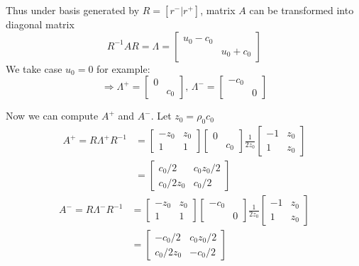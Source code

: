 \documentclass[11pt]{article}
\begin{document}
\begin{enumerate}
\begin{enumerate}
					Thus under basis generated by $R=[r^-|r^+]$, matrix $A$ can be transformed into diagonal matrix
					\[ R^{-1}AR=\Lambda=\begin{bmatrix}u_0-c_0&\\&u_0+c_0\end{bmatrix}	\]						We take case $u_0=0$ for example:					
					\[
					\Rightarrow \Lambda^+=\begin{bmatrix}0&\\&c_0\end{bmatrix}
					\text{,  }
					\Lambda^-=\begin{bmatrix}-c_0&\\&0\end{bmatrix}
					\]
					
					Now we can compute $A^+$ and $A^-$. Let $z_0=\rho_0c_0$
					\begin{align*}
					A^+=R\Lambda^+R^{-1}
					&=\begin{bmatrix}-z_0&z_0\\1&1\end{bmatrix}
					\begin{bmatrix}0&\\&c_0\end{bmatrix}\frac{1}{2z_0}
					\begin{bmatrix}-1&z_0\\1&z_0\end{bmatrix}\\
					&=\begin{bmatrix}c_0/2&c_0z_0/2\\c_0/2z_0&c_0/2\end{bmatrix}
					\end{align*}
					\begin{align*}
					A^-=R\Lambda^-R^{-1}
					&=\begin{bmatrix}-z_0&z_0\\1&1\end{bmatrix}
					\begin{bmatrix}-c_0&\\&0\end{bmatrix}\frac{1}{2z_0}
					\begin{bmatrix}-1&z_0\\1&z_0\end{bmatrix}\\
					&=\begin{bmatrix}-c_0/2&c_0z_0/2\\c_0/2z_0&-c_0/2\end{bmatrix}
					\end{align*}
					

\end{enumerate}
\end{enumerate}
\end{document}
